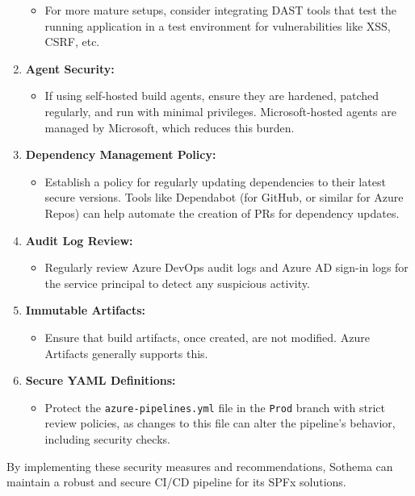 \begin{enumerate}
    \begin{itemize}
        \item For more mature setups, consider integrating DAST tools that test the running application in a test environment for vulnerabilities like XSS, CSRF, etc.
    \end{itemize}
    \item \textbf{Agent Security:}
    \begin{itemize}
        \item If using self-hosted build agents, ensure they are hardened, patched regularly, and run with minimal privileges. Microsoft-hosted agents are managed by Microsoft, which reduces this burden.
    \end{itemize}
    \item \textbf{Dependency Management Policy:}
    \begin{itemize}
        \item Establish a policy for regularly updating dependencies to their latest secure versions. Tools like Dependabot (for GitHub, or similar for Azure Repos) can help automate the creation of PRs for dependency updates.
    \end{itemize}
    \item \textbf{Audit Log Review:}
    \begin{itemize}
        \item Regularly review Azure DevOps audit logs and Azure AD sign-in logs for the service principal to detect any suspicious activity.
    \end{itemize}
    \item \textbf{Immutable Artifacts:}
    \begin{itemize}
        \item Ensure that build artifacts, once created, are not modified. Azure Artifacts generally supports this.
    \end{itemize}
    \item \textbf{Secure YAML Definitions:}
    \begin{itemize}
        \item Protect the \texttt{azure-pipelines.yml} file in the \texttt{Prod} branch with strict review policies, as changes to this file can alter the pipeline's behavior, including security checks.
    \end{itemize}
\end{enumerate}

By implementing these security measures and recommendations, Sothema can maintain a robust and secure CI/CD pipeline for its SPFx solutions.
